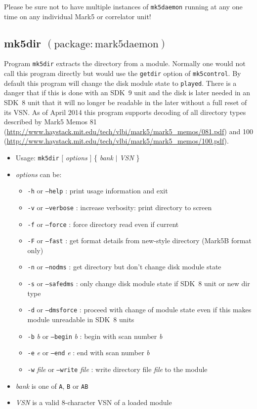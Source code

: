 Please be sure not to have multiple instances of {\tt mk5daemon} running at any one time on any individual Mark5 or correlator unit!








\subsection{mk5dir {\small $\mathrm{(package: mark5daemon)}$}} \label{sec:mk5dir}

Program {\tt mk5dir} extracts the directory from a module.
Normally one would not call this program directly but would use the {\tt getdir} option of {\tt mk5control}.
By default this program will change the disk module state to {\tt played}.
There is a danger that if this is done with an SDK~9 unit and the disk is later needed in an SDK~8 unit that it will no longer be readable in the later without a full reset of its VSN.
As of April 2014 this program supports decoding of all directory types described by Mark5 Memos 81 (\url{http://www.haystack.mit.edu/tech/vlbi/mark5/mark5_memos/081.pdf}) and 100 (\url{http://www.haystack.mit.edu/tech/vlbi/mark5/mark5_memos/100.pdf}).

\begin{itemize}
\item[] Usage: {\tt mk5dir} $[$ {\em options} $]$ \{ {\em bank} $\mid$ {\em VSN} \}
\item[] {\em options} can be:
\begin{itemize}
\item[] {\tt -h} or {\tt --help} : print usage information and exit
\item[] {\tt -v} or {\tt --verbose} : increase verbosity: print directory to screen
\item[] {\tt -f} or {\tt --force} : force directory read even if current
\item[] {\tt -F} or {\tt --fast} : get format details from new-style directory (Mark5B format only)
\item[] {\tt -n} or {\tt --nodms} : get directory but don't change disk module state
\item[] {\tt -s} or {\tt --safedms} : only change disk module state if SDK~8 unit or new dir type
\item[] {\tt -d} or {\tt --dmsforce} : proceed with change of module state even if this makes module unreadable in SDK~8 units
\item[] {\tt -b} {\em b} or {\tt --begin} {\em b} : begin with scan number {\em b}
\item[] {\tt -e} {\em e} or {\tt --end} {\em e} : end with scan number {\em b}
\item[] {\tt -w} {\em file} or {\tt --write} {\em file} : write directory file {\em file} to the module
\end{itemize}
\item[] {\em bank} is one of {\tt A}, {\tt B} or {\tt AB}
\item[] {\em VSN} is a valid 8-character VSN of a loaded module
\end{itemize}

